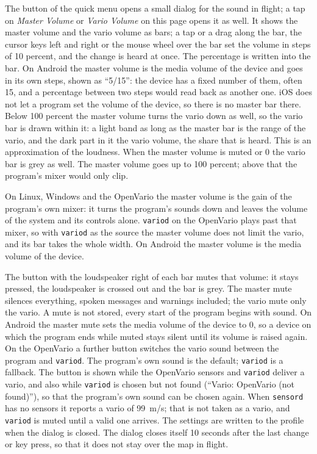 The button  of the quick menu opens a small dialog for the
sound in flight; a tap on \emph{Master Volume} or \emph{Vario Volume}
on this page opens it as well.  It shows the master volume and the vario
volume as bars; a tap or a drag along the bar, the cursor keys left
and right or the mouse wheel over the bar set the volume in steps of 10
percent, and the change is heard
at once.  The percentage is written into the bar.  On Android the master
volume is the media volume of the device and goes in its own steps,
shown as ``5/15'': the device has a fixed number of them, often 15, and
a percentage between two steps would read back as another one.  iOS
does not let a program set the volume of the device, so there is no
master bar there.  Below 100 percent the
master volume turns the vario down as well, so the vario bar is drawn
within it: a light band as long as the master bar is the range of the
vario, and the dark part in it the vario volume, the share that is
heard.  This is an approximation of the loudness.  When the master
volume is muted or 0 the vario bar is grey as well.  The master volume goes up
to 100 percent; above that the program's mixer would only clip.

On Linux, Windows and the OpenVario the master volume is the gain of the
program's own mixer: it turns the program's sounds down and leaves the
volume of the system and its controls alone.  \texttt{variod} on the
OpenVario plays past that mixer, so with \texttt{variod} as the source
the master volume does not limit the vario, and its bar takes the whole
width.  On Android the master volume is the media volume of the device.

The button with the loudspeaker right of each bar mutes that volume: it
stays pressed, the loudspeaker is crossed out and the bar is grey.  The
master mute silences everything, spoken messages and warnings included;
the vario mute only the vario.  A mute is not stored, every start of the
program begins with sound.  On Android the master mute sets the media
volume of the device to 0, so a device on which the program ends while
muted stays silent until its volume is raised again.  On the OpenVario
a further button switches the vario sound between the program and
\texttt{variod}.  The program's own sound is the default; \texttt{variod}
is a fallback.  The button is shown while the OpenVario sensors and
\texttt{variod} deliver a vario, and also while \texttt{variod} is chosen
but not found (``Vario: OpenVario (not found)''), so that the program's
own sound can be chosen again.  When \texttt{sensord} has no sensors it
reports a vario of 99~m/s; that is not taken as a vario, and
\texttt{variod} is muted until a valid one arrives.  The settings are
written to the profile when the dialog is closed.  The dialog closes
itself 10 seconds after the last change or key press, so that it does
not stay over the map in flight.


